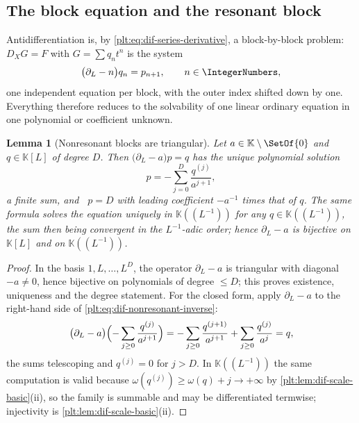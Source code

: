 \documentclass[11pt,oneside]{article}
\theoremstyle{plain}
\newtheorem{lemma}[theorem]{Lemma}
\theoremstyle{definition}
\theoremstyle{remark}
\newcommand{\K}{\mathbb{K}}
\DeclareMathOperator{\degL}{deg_{L}}
\newcommand{\DX}{D_{X}}                                  %
\begin{document}
\subsection{The block equation and the resonant block}
\label{plt:sec:dif-block-equation}

Antidifferentiation is, by \cref{plt:eq:dif-series-derivative}, a
block-by-block problem: \(\DX G=F\) with \(G=\sum q_{n}t^{n}\) is the system
\begin{equation}\label{plt:eq:dif-block-system}
  \bigl(\partial_{L}-n\bigr)q_{n}=p_{n+1},
  \qquad n\in\IntegerNumbers,
\end{equation}
one independent equation per block, with the outer index shifted down by one.
Everything therefore reduces to the solvability of one linear ordinary
equation in one polynomial or coefficient unknown.

\begin{lemma}[Nonresonant blocks are triangular]\label{plt:lem:dif-triangular}
Let \(a\in\K\setminus\SetOf{0}\) and \(q\in\K[L]\) of degree \(D\).  Then
\(\bigl(\partial_{L}-a\bigr)p=q\) has the unique polynomial solution
\begin{equation}\label{plt:eq:dif-nonresonant-inverse}
  p=-\sum_{j=0}^{D}\frac{q^{(j)}}{a^{j+1}},
\end{equation}
a finite sum, and \(\degL p=D\) with leading coefficient \(-a^{-1}\) times that
of \(q\).  The same formula solves the equation uniquely in \(\K((L^{-1}))\)
for any \(q\in\K((L^{-1}))\), the sum then being convergent in the
\(L^{-1}\)-adic order; hence \(\partial_{L}-a\) is bijective on
\(\K[L]\) and on \(\K((L^{-1}))\).
\end{lemma}

\begin{proof}
In the basis \(1,L,\dots,L^{D}\), the operator \(\partial_{L}-a\) is triangular
with diagonal \(-a\ne0\), hence bijective on polynomials of degree \(\le D\);
this proves existence, uniqueness and the degree statement.  For the closed
form, apply \(\partial_{L}-a\) to the right-hand side of
\cref{plt:eq:dif-nonresonant-inverse}:
\[
  \bigl(\partial_{L}-a\bigr)
  \Bigl(-\sum_{j\ge0}\frac{q^{(j)}}{a^{j+1}}\Bigr)
  =-\sum_{j\ge0}\frac{q^{(j+1)}}{a^{j+1}}+\sum_{j\ge0}\frac{q^{(j)}}{a^{j}}
  =q,
\]
the sums telescoping and \(q^{(j)}=0\) for \(j>D\).  In \(\K((L^{-1}))\) the
same computation is valid because \(\omega(q^{(j)})\ge\omega(q)+j\to+\infty\)
by \cref{plt:lem:dif-scale-basic}(ii), so the family is summable and may be
differentiated termwise; injectivity is
\cref{plt:lem:dif-scale-basic}(ii).
\end{proof}
\end{document}
